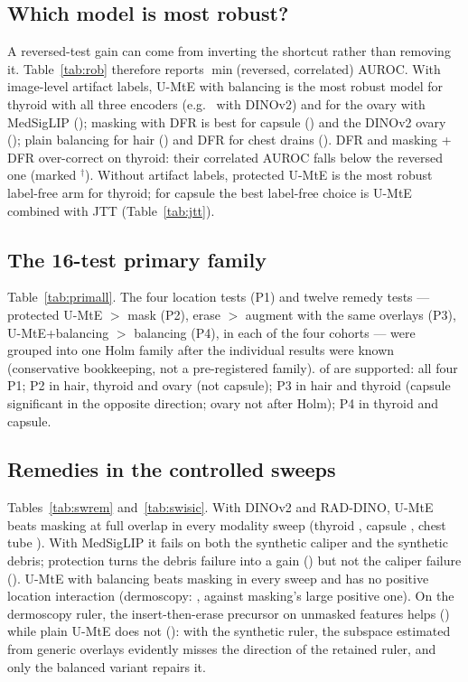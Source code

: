 \subsection{Which model is most robust?}
A reversed-test gain can come from inverting the shortcut rather than removing it. Table~\ref{tab:rob} therefore reports
$\min$(reversed, correlated) AUROC. With image-level artifact labels, U-MtE with balancing is the most robust model for
thyroid with all three encoders (e.g.\ \sSixRobThyroidDINOvTwomtebalanced{} with DINOv2) and for the ovary with MedSigLIP
(\sSixRobOvarianMedSigLIPmtebalanced); masking with DFR is best for capsule (\sSixRobCapsuleDINOvTwomaskdfr) and the DINOv2
ovary (\sSixRobOvarianDINOvTwomaskdfr); plain balancing for hair (\sSixRobDermoscopyDINOvTwobalanced) and DFR for chest
drains (\sSixRobChestRADDINOdfr). DFR and masking + DFR over-correct on thyroid: their correlated AUROC falls below the
reversed one (marked $^\dagger$). Without artifact labels, protected U-MtE is the most robust label-free arm for thyroid; for
capsule the best label-free choice is U-MtE combined with JTT (Table~\ref{tab:jtt}).


\subsection{The 16-test primary family}
Table~\ref{tab:primall}. The four location tests (P1) and twelve remedy tests --- protected U-MtE $>$ mask (P2), erase $>$
augment with the same overlays (P3), U-MtE+balancing $>$ balancing (P4), in each of the four cohorts --- were grouped
into one Holm family after the individual results were known (conservative bookkeeping, not a pre-registered family).
\sSixNPrimOK{} of \sSixNPrim{} are supported: all four P1; P2 in hair, thyroid and ovary (not capsule); P3 in hair and
thyroid (capsule significant in the opposite direction; ovary not after Holm); P4 in thyroid and capsule.


\subsection{Remedies in the controlled sweeps}
Tables~\ref{tab:swrem} and~\ref{tab:swisic}. With DINOv2 and RAD-DINO, U-MtE beats masking at full overlap in every modality sweep
(thyroid \sSixSwthyroiddinoFiveOneEightUmte, capsule \sSixSwcapsuledinoFiveOneEightUmte, chest tube
\sSixSwcxrraddinoFiveOneEightUmte).
With MedSigLIP it fails on both the synthetic caliper and the synthetic debris; protection turns the debris failure into
a gain (\sSixSwcapsulemedsiglipProt) but not the caliper failure (\sSixSwthyroidmedsiglipProt). U-MtE with balancing beats
masking in every sweep and has no positive location interaction (dermoscopy: \sSixSwIsicBalInter, against masking's large
positive one). On the dermoscopy ruler, the insert-then-erase precursor on unmasked features helps
(\sSixSwIsicUitwoe) while plain U-MtE does not (\sSixSwIsicUmte): with the
synthetic ruler, the subspace estimated from generic overlays evidently misses the direction of the retained ruler, and
only the balanced variant repairs it.



